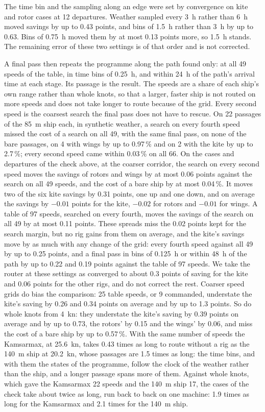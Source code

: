 The time bin and the sampling along an edge were set by convergence on kite and rotor cases at 12 departures. Weather sampled every \SI{3}{h} rather than \SI{6}{h} moved savings by up to 0.43 points, and bins of \SI{1.5}{h} rather than \SI{3}{h} by up to 0.63. Bins of \SI{0.75}{h} moved them by at most 0.13 points more, so \SI{1.5}{h} stands. The remaining error of these two settings is of that order and is not corrected.

A final pass then repeats the programme along the path found only: at all 49 speeds of the table, in time bins of \SI{0.25}{h}, and within \SI{24}{h} of the path's arrival time at each stage. Its passage is the result. The speeds are a share of each ship's own range rather than whole knots, so that a larger, faster ship is not routed on more speeds and does not take longer to route because of the grid. Every second speed is the coarsest search the final pass does not have to rescue. On 22 passages of the \SI{85}{m} ship each, in synthetic weather, a search on every fourth speed missed the cost of a search on all 49, with the same final pass, on none of the bare passages, on 4 with wings by up to 0.97\,\% and on 2 with the kite by up to 2.7\,\%; every second speed came within 0.03\,\% on all 66. On the cases and departures of the check above, at the coarser corridor, the search on every second speed moves the savings of rotors and wings by at most 0.06 points against the search on all 49 speeds, and the cost of a bare ship by at most 0.04\,\%. It moves two of the six kite savings by 0.31 points, one up and one down, and on average the savings by $-0.01$ points for the kite, $-0.02$ for rotors and $-0.01$ for wings. A table of 97 speeds, searched on every fourth, moves the savings of the search on all 49 by at most 0.11 points. These spreads miss the 0.02 points kept for the search margin, but no rig gains from them on average, and the kite's savings move by as much with any change of the grid: every fourth speed against all 49 by up to 0.25 points, and a final pass in bins of \SI{0.125}{h} or within \SI{48}{h} of the path by up to 0.22 and 0.19 points against the table of 97 speeds. We take the router at these settings as converged to about 0.3 points of saving for the kite and 0.06 points for the other rigs, and do not correct the rest. Coarser speed grids do bias the comparison: 25 table speeds, or 9 commanded, understate the kite's saving by 0.26 and 0.34 points on average and by up to 1.3 points. So do whole knots from \SI{4}{kn}: they understate the kite's saving by 0.39 points on average and by up to 0.73, the rotors' by 0.15 and the wings' by 0.06, and miss the cost of a bare ship by up to 0.57\,\%. With the same number of speeds the Kamsarmax, at \SI{25.6}{kn}, takes 0.43 times as long to route without a rig as the \SI{140}{m} ship at \SI{20.2}{kn}, whose passages are 1.5 times as long: the time bins, and with them the states of the programme, follow the clock of the weather rather than the ship, and a longer passage spans more of them. Against whole knots, which gave the Kamsarmax 22 speeds and the \SI{140}{m} ship 17, the cases of the check take about twice as long, run back to back on one machine: 1.9 times as long for the Kamsarmax and 2.1 times for the \SI{140}{m} ship.
